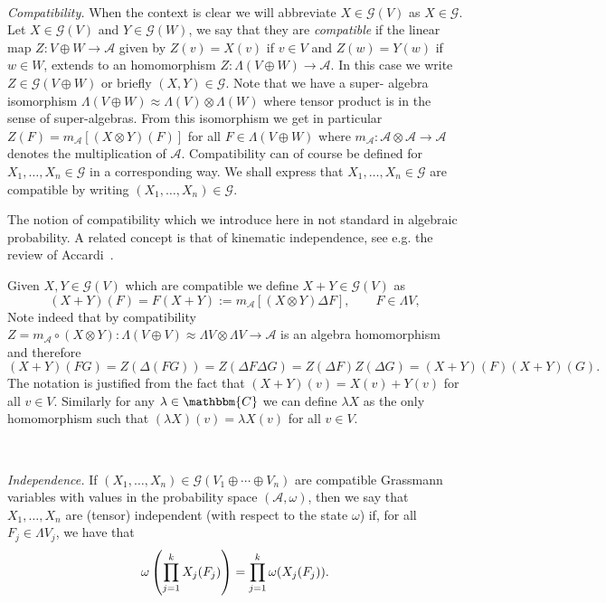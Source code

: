 \documentclass[11pt]{article}
\newcommand{\assign}{:=}
\newcommand{\tmtextit}[1]{{\itshape{#1}}}
\begin{document}
\

\tmtextit{Compatibility.} When the context is clear we will abbreviate $X \in
\mathcal{G} (V)$ as $X \in \mathcal{G}$. Let $X \in \mathcal{G} (V)$ and $Y
\in \mathcal{G} (W)$, we say that they are \tmtextit{compatible} if the linear
map $Z : V \oplus W \rightarrow \mathcal{A}$ given by $Z (v) = X (v)$ if $v
\in V$ and $Z (w) = Y (w)$ if $w \in W$, extends to an homomorphism $Z :
\Lambda (V \oplus W) \rightarrow \mathcal{A}$. In this case we write $Z \in
\mathcal{G} (V \oplus W)$ or briefly $(X, Y) \in \mathcal{G}$. Note that we
have a super- algebra isomorphism $\Lambda (V \oplus W) \approx \Lambda (V)
\otimes \Lambda (W)$ where tensor product is in the sense of super-algebras.
From this isomorphism we get in particular $Z (F) = m_{\mathcal{A}} [(X
\otimes Y) (F)]$ for all $F \in \Lambda (V \oplus W)$ where $m_{\mathcal{A}} :
\mathcal{A} \otimes \mathcal{A} \rightarrow \mathcal{A}$ denotes the
multiplication of $\mathcal{A}$. Compatibility can of course be defined for
$X_1, \ldots, X_n \in \mathcal{G}$ in a corresponding way. We shall express
that $X_1, \ldots, X_n \in \mathcal{G}$ are compatible by writing $(X_1,
\ldots, X_n) \in \mathcal{G}$.

\begin{remark}
  The notion of compatibility which we introduce here in not standard in
  algebraic probability. A related concept is that of kinematic independence,
  see e.g. the review of Accardi~{\cite{accardi_outline_2015}}.
\end{remark}

Given $X, Y \in \mathcal{G} (V)$ which are compatible we define $X + Y \in
\mathcal{G} (V)$ as
\[ (X + Y) (F) = F (X + Y) \assign m_{\mathcal{A}} [(X \otimes Y) \Delta F],
   \qquad F \in \Lambda V, \]
Note indeed that by compatibility $Z = m_{\mathcal{A}} \circ (X \otimes Y) :
\Lambda (V \oplus V) \approx \Lambda V \otimes \Lambda V \rightarrow
\mathcal{A}$ is an algebra homomorphism and therefore \
\[ (X + Y) (F G) = Z (\Delta (F G)) = Z (\Delta F \Delta G) = Z (\Delta F) Z
   (\Delta G) = (X + Y) (F) (X + Y) (G) . \]
The notation is justified from the fact that $(X + Y) (v) = X (v) + Y (v)$ for
all $v \in V$. Similarly for any $\lambda \in \mathbbm{C}$ we can define
$\lambda X$ as the only homomorphism such that $(\lambda X) (v) = \lambda X
(v)$ for all $v \in V$.

\

\tmtextit{Independence.} If $(X_1, \ldots, X_n) \in \mathcal{G} (V_1 \oplus
\cdots \oplus V_n)$ are compatible Grassmann variables with values in the
probability space $(\mathcal{A}, \omega)$, then we say that $X_1, \ldots, X_n$
are (tensor) independent (with respect to the state $\omega$) if, for all $F_j
\in \Lambda V_j$, we have that~{\cite{dirksen_noncommutative_2010}}
\[ \omega \left( \prod_{j = 1}^k \vphantom{\frac{}{}} X_j (F_j) \right) =
   \prod_{j = 1}^k \omega (X_j (F_j)) . \]
\end{document}
